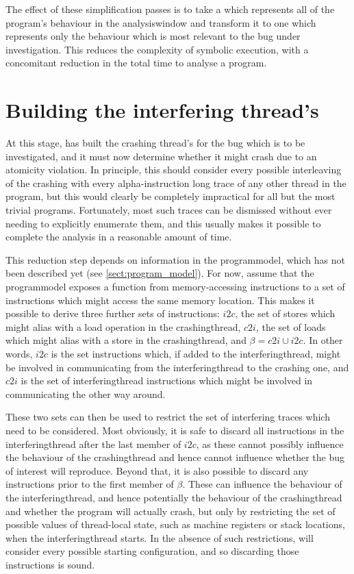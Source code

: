 The effect of these simplification passes is to take a {\StateMachine}
which represents all of the program's behaviour in the
\gls{analysiswindow} and transform it to one which represents only the
behaviour which is most relevant to the bug under investigation.  This
reduces the complexity of symbolic execution, with a concomitant
reduction in the total time to analyse a program.

\section{Building the interfering thread's \StateMachines}
\label{sect:derive:write_side}

At this stage, {\technique} has built the crashing thread's
{\StateMachine} for the bug which is to be investigated, and it must
now determine whether it might crash due to an atomicity violation.
In principle, this should consider every possible interleaving of the
crashing {\StateMachine} with every \gls{alpha}-instruction long trace
of any other thread in the program, but this would clearly be
completely impractical for all but the most trivial programs.
Fortunately, most such traces can be dismissed without ever needing to
explicitly enumerate them, and this usually makes it possible to
complete the analysis in a reasonable amount of time.

This reduction step depends on information in the \gls{programmodel},
which has not been described yet (see \autoref{sect:program_model}).
For now, assume that the \gls{programmodel} exposes a function from
memory-accessing instructions to a set of instructions which might
access the same memory location.  This makes it possible to derive
three further sets of instructions: $i2c$, the set of stores which
might alias with a load operation in the \gls{crashingthread}, $c2i$,
the set of loads which might alias with a store in the
\gls{crashingthread}, and $\beta = c2i \cup i2c$.  In other words,
$i2c$ is the set instructions which, if added to the
\gls{interferingthread}, might be involved in communicating from the
\gls{interferingthread} to the crashing one, and $c2i$ is the set of
\gls{interferingthread} instructions which might be involved in
communicating the other way around.

These two sets can then be used to restrict the set of interfering
traces which need to be considered.  Most obviously, it is safe to
discard all instructions in the \gls{interferingthread} after the last
member of $i2c$, as these cannot possibly influence the behaviour of
the \gls{crashingthread} and hence cannot influence whether the bug of
interest will reproduce.  Beyond that, it is also possible to discard
any instructions prior to the first member of $\beta$.  These can
influence the behaviour of the \gls{interferingthread}, and hence
potentially the behaviour of the \gls{crashingthread} and whether the
program will actually crash, but only by restricting the set of
possible values of thread-local state, such as machine registers or
stack locations, when the \gls{interferingthread} starts.  In the
absence of such restrictions, {\technique} will consider every
possible starting configuration, and so discarding those instructions
is sound.

